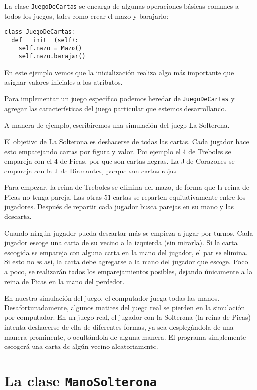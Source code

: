 La clase \texttt{JuegoDeCartas} se encarga de algunas operaciones
básicas comunes a todos los juegos, tales como crear el mazo y barajarlo:

\begin{verbatim}
class JuegoDeCartas:
  def __init__(self):
    self.mazo = Mazo()
    self.mazo.barajar()
\end{verbatim}
 En este ejemplo vemos que la inicialización realiza algo más importante
que asignar valores iniciales a los atributos.

Para implementar un juego específico podemos heredar de \texttt{JuegoDeCartas}
y agregar las características del juego particular que estemos desarrollando.

A manera de ejemplo, escribiremos una simulación del juego La Solterona.

El objetivo de La Solterona es deshacerse de todas las cartas. Cada
jugador hace esto emparejando cartas por figura y valor. Por ejemplo
el 4 de Treboles se empareja con el 4 de Picas, por que son cartas
negras. La J de Corazones se empareja con la J de Diamantes, porque
son cartas rojas.

Para empezar, la reina de Treboles se elimina del mazo, de forma que
la reina de Picas no tenga pareja. Las otras 51 cartas se reparten
equitativamente entre los jugadores. Después de repartir cada jugador
busca parejas en su mano y las descarta.

Cuando ningún jugador pueda descartar más se empieza a jugar por turnos.
Cada jugador escoge una carta de su vecino a la izquierda (sin mirarla).
Si la carta escogida se empareja con alguna carta en la mano del jugador,
el par se elimina. Si esto no es así, la carta debe agregarse a la
mano del jugador que escoge. Poco a poco, se realizarán todos los
emparejamientos posibles, dejando únicamente a la reina de Picas en
la mano del perdedor.

En nuestra simulación del juego, el computador juega todas las manos.
Desafortunadamente, algunos matices del juego real se pierden en la
simulación por computador. En un juego real, el jugador con la Solterona
(la reina de Picas) intenta deshacerse de ella de diferentes formas,
ya sea desplegándola de una manera prominente, o ocultándola de alguna
manera. El programa simplemente escogerá una carta de algún vecino
aleatoriamente.

\section{La clase \texttt{ManoSolterona}}

